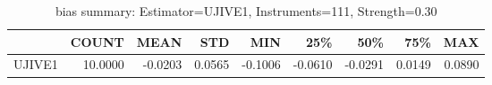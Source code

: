 \begin{table}[ht]
\centering
\caption{bias summary: Estimator=UJIVE1, Instruments=111, Strength=0.30}
\begin{tabular}{lrrrrrrrr}
\toprule
 & COUNT & MEAN & STD & MIN & 25\% & 50\% & 75\% & MAX \\
\midrule
UJIVE1 & 10.0000 & -0.0203 & 0.0565 & -0.1006 & -0.0610 & -0.0291 & 0.0149 & 0.0890 \\
\bottomrule
\end{tabular}
\end{table}
